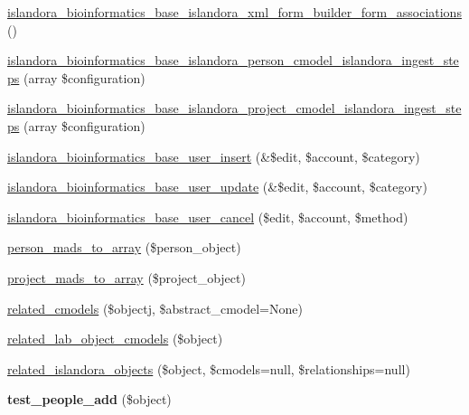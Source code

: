 \begin{DoxyCompactItemize}
\item 
\hyperlink{islandora__bioinformatics__base_8module_ac6e286f916e9b73cb3188ed36087132b}{islandora\+\_\+bioinformatics\+\_\+base\+\_\+islandora\+\_\+xml\+\_\+form\+\_\+builder\+\_\+form\+\_\+associations} ()
\item 
\hyperlink{islandora__bioinformatics__base_8module_aefe0d4e7b872b61e1fdf02d44dd11407}{islandora\+\_\+bioinformatics\+\_\+base\+\_\+islandora\+\_\+person\+\_\+cmodel\+\_\+islandora\+\_\+ingest\+\_\+steps} (array \$configuration)
\item 
\hyperlink{islandora__bioinformatics__base_8module_a52dced9b9bf216d349f5974cdcc0ec95}{islandora\+\_\+bioinformatics\+\_\+base\+\_\+islandora\+\_\+project\+\_\+cmodel\+\_\+islandora\+\_\+ingest\+\_\+steps} (array \$configuration)
\item 
\hyperlink{islandora__bioinformatics__base_8module_a0986c4a58fa2eed5df09ab9bdb7d6f47}{islandora\+\_\+bioinformatics\+\_\+base\+\_\+user\+\_\+insert} (\&\$edit, \$account, \$category)
\item 
\hyperlink{islandora__bioinformatics__base_8module_a1a3a11905730edcebeb2d8577756ae3e}{islandora\+\_\+bioinformatics\+\_\+base\+\_\+user\+\_\+update} (\&\$edit, \$account, \$category)
\item 
\hyperlink{islandora__bioinformatics__base_8module_aa5707478f46c88f1840a3d7e341fb5e1}{islandora\+\_\+bioinformatics\+\_\+base\+\_\+user\+\_\+cancel} (\$edit, \$account, \$method)
\item 
\hyperlink{islandora__bioinformatics__base_8module_a2d88db4e05c753b2fd28042ce12f1d12}{person\+\_\+mads\+\_\+to\+\_\+array} (\$person\+\_\+object)
\item 
\hyperlink{islandora__bioinformatics__base_8module_a8a44fbb60fa898cede4db18005cd8602}{project\+\_\+mads\+\_\+to\+\_\+array} (\$project\+\_\+object)
\item 
\hyperlink{islandora__bioinformatics__base_8module_a042f57d3aea3c501198ded2f31193f6c}{related\+\_\+cmodels} (\$objectj, \$abstract\+\_\+cmodel=None)
\item 
\hyperlink{islandora__bioinformatics__base_8module_aae0f40af714fe2b8b0435eeabbb00152}{related\+\_\+lab\+\_\+object\+\_\+cmodels} (\$object)
\item 
\hyperlink{islandora__bioinformatics__base_8module_a1dc5e940beb7a2b30952ce00b01d388e}{related\+\_\+islandora\+\_\+objects} (\$object, \$cmodels=null, \$relationships=null)
\item 
\hypertarget{islandora__bioinformatics__base_8module_a99b5ea81575c95fda8879358c2ea0999}{{\bfseries test\+\_\+people\+\_\+add} (\$object)}\label{islandora__bioinformatics__base_8module_a99b5ea81575c95fda8879358c2ea0999}

\end{DoxyCompactItemize}
